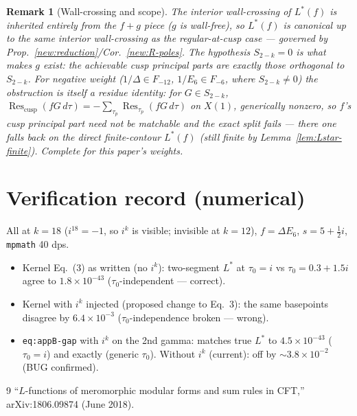 \documentclass[11pt]{article}
\newtheorem{remark}{Remark}
\DeclareMathOperator{\Res}{Res}\DeclareMathOperator{\im}{Im}
\begin{document}
\begin{remark}[Wall-crossing and scope]
The interior wall-crossing of $L^*(f)$ is inherited entirely from the
$f+g$ piece ($g$ is wall-free), so $L^*(f)$ is canonical up to the same
interior wall-crossing as the regular-at-cusp case --- governed by
Prop.~\ref{new:reduction}/Cor.~\ref{new:R-poles}. The hypothesis
$S_{2-k}=0$ is what makes $g$ exist: the achievable cusp principal
parts are exactly those orthogonal to $S_{2-k}$. For negative weight
($1/\Delta\in F_{-12}$, $1/E_6\in F_{-6}$, where $S_{2-k}\neq0$) the
obstruction is itself a residue identity: for $G\in S_{2-k}$,
$\Res_{\mathrm{cusp}}(fG\,d\tau)=-\sum_{\tau_p}\Res_{\tau_p}(fG\,d\tau)$
on $X(1)$, generically nonzero, so $f$'s cusp principal part need not be
matchable and the exact split fails --- there one falls back on the
direct finite-contour $L^*(f)$ (still finite by
Lemma~\ref{lem:Lstar-finite}). Complete for this paper's weights.
\end{remark}

\section*{Verification record (numerical)}
\noindent All at $k=18$ ($i^{18}=-1$, so $i^k$ is visible; invisible at
$k=12$), $f=\Delta E_6$, $s=5+\tfrac12 i$, \texttt{mpmath} 40 dps.
\begin{itemize}[leftmargin=1.4em]
\item Kernel Eq.~(3) as written (no $i^k$): two-segment $L^*$ at
$\tau_0=i$ vs $\tau_0=0.3+1.5i$ agree to $1.8\times10^{-43}$
($\tau_0$-independent --- correct).
\item Kernel with $i^k$ injected (proposed change to Eq.~3): the same
basepoints disagree by $6.4\times10^{-3}$ ($\tau_0$-independence broken
--- wrong).
\item \texttt{eq:appB-gap} with $i^k$ on the 2nd gamma: matches true
$L^*$ to $4.5\times10^{-43}$ ($\tau_0=i$) and exactly (generic
$\tau_0$). Without $i^k$ (current): off by $\sim3.8\times10^{-2}$
(BUG confirmed).
\end{itemize}

\begin{thebibliography}{9}
 ``$L$-functions of meromorphic modular forms and sum
rules in CFT,'' arXiv:1806.09874 (June 2018).
\end{thebibliography}
\end{document}
